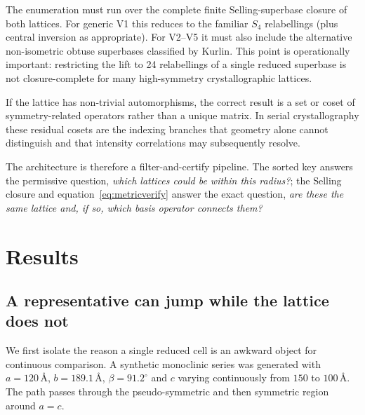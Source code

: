 \documentclass[11pt]{article}
\newcommand{\Ang}{\text{\AA}}
\begin{document}
The enumeration must run over the complete finite Selling-superbase closure of both lattices. For generic V1 this reduces to the familiar $S_4$ relabellings (plus central inversion as appropriate). For V2--V5 it must also include the alternative non-isometric obtuse superbases classified by Kurlin. This point is operationally important: restricting the lift to 24 relabellings of a single reduced superbase is not closure-complete for many high-symmetry crystallographic lattices.

If the lattice has non-trivial automorphisms, the correct result is a set or coset of symmetry-related operators rather than a unique matrix. In serial crystallography these residual cosets are the indexing branches that geometry alone cannot distinguish and that intensity correlations may subsequently resolve.

The architecture is therefore a filter-and-certify pipeline. The sorted key answers the permissive question, \emph{which lattices could be within this radius?}; the Selling closure and equation~\eqref{eq:metricverify} answer the exact question, \emph{are these the same lattice and, if so, which basis operator connects them?}

\section{Results}

\subsection{A representative can jump while the lattice does not}

We first isolate the reason a single reduced cell is an awkward object for continuous comparison. A synthetic monoclinic series was generated with $a=120\,\Ang$, $b=189.1\,\Ang$, $\beta=91.2^\circ$ and $c$ varying continuously from $150$ to $100\,\Ang$. The path passes through the pseudo-symmetric and then symmetric region around $a=c$.
\end{document}
